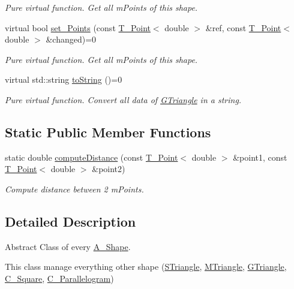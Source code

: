 \begin{DoxyCompactItemize}
\begin{DoxyCompactList}\small\item\em Pure virtual function. Get all mPoints of this shape. \end{DoxyCompactList}\item
virtual bool \hyperlink{classShape_a6eb0d80cccc44cb72b06c61d9780bc6b}{set\+\_\+\+Points} (const \hyperlink{classPoint}{T_Point}$<$ double $>$ \&ref, const \hyperlink{classPoint}{T_Point}$<$ double $>$ \&changed)=0
\begin{DoxyCompactList}\small\item\em Pure virtual function. Get all mPoints of this shape. \end{DoxyCompactList}\item
virtual std\+::string \hyperlink{classShape_a98fa87c6dc4c7045fd6897a8f3bc186c}{to\+String} ()=0
\begin{DoxyCompactList}\small\item\em Pure virtual function. Convert all data of \hyperlink{classGTriangle}{G\+Triangle} in a string. \end{DoxyCompactList}\end{DoxyCompactItemize}
\subsection*{Static Public Member Functions}
\begin{DoxyCompactItemize}
\item 
static double \hyperlink{classShape_aadd5fcb0535a62f4ed4dcfb39e86336a}{compute\+Distance} (const \hyperlink{classPoint}{T_Point}$<$ double $>$ \&point1, const \hyperlink{classPoint}{T_Point}$<$ double $>$ \&point2)
\begin{DoxyCompactList}\small\item\em Compute distance between 2 mPoints. \end{DoxyCompactList}\end{DoxyCompactItemize}


\subsection{Detailed Description}
Abstract Class of every \hyperlink{classShape}{A_Shape}.

This class manage everything other shape (\hyperlink{classSTriangle}{S\+Triangle}, \hyperlink{classMTriangle}{M\+Triangle}, \hyperlink{classGTriangle}{G\+Triangle}, \hyperlink{classSquare}{C_Square}, \hyperlink{classParallelogram}{C_Parallelogram})

